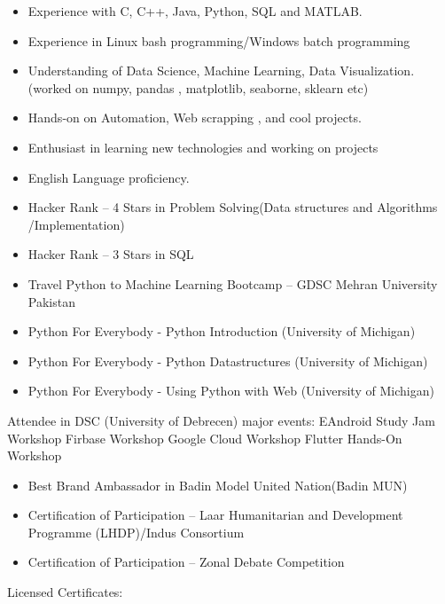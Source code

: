 \documentclass[10pt,a4paper,ragged2e,withhyper]{altacv}
\begin{document}
\begin{paracol}{2}
\begin{itemize}
\item Experience with C, C++, Java, Python, SQL and MATLAB.
\item Experience in Linux bash programming/Windows batch programming
\item Understanding of Data Science, Machine Learning, Data Visualization. (worked on numpy, pandas , matplotlib, seaborne, sklearn etc)
\item Hands-on on Automation, Web scrapping , and cool projects.
\item Enthusiast in learning new technologies and working on projects 
\item English Language proficiency.
\end{itemize}

\divider



\begin{itemize}
\item Hacker Rank -- 4 Stars in Problem Solving(Data structures and Algorithms /Implementation)
\item Hacker Rank -- 3 Stars in SQL
\item Travel Python to Machine Learning Bootcamp -- GDSC Mehran University Pakistan
\item Python For Everybody - Python Introduction (University of Michigan)
\item Python For Everybody - Python Datastructures (University of Michigan)
\item Python For Everybody - Using Python with Web (University of Michigan)
\end{itemize}
\begin{outline}
\1 Attendee in DSC (University of Debrecen) major events:
\2 EAndroid Study Jam Workshop
\2 Firbase Workshop
\2 Google Cloud Workshop
\2 Flutter Hands-On Workshop
\end{outline}         
	 
\begin{itemize}
\item Best Brand Ambassador in Badin Model United Nation(Badin MUN)
\item      Certification of Participation – Laar Humanitarian and Development Programme (LHDP)/Indus Consortium
\item      Certification of Participation – Zonal Debate Competition 
\end{itemize}
Licensed Certificates:


\end{paracol}
\end{document}
